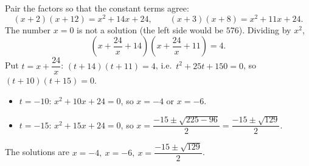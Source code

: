 Pair the factors so that the constant terms agree:
\[
(x+2)(x+12)=x^2+14x+24,\qquad(x+3)(x+8)=x^2+11x+24 .
\]
The number $x=0$ is not a solution (the left side would be $576$). Dividing by $x^2$,
\[
\left(x+\dfrac{24}{x}+14\right)\left(x+\dfrac{24}{x}+11\right)=4 .
\]
Put $t=x+\dfrac{24}{x}$: $(t+14)(t+11)=4$, i.e.\ $t^2+25t+150=0$, so $(t+10)(t+15)=0$.
\begin{itemize}
\item $t=-10$: $x^2+10x+24=0$, so $x=-4$ or $x=-6$.
\item $t=-15$: $x^2+15x+24=0$, so $x=\dfrac{-15\pm\sqrt{225-96}}{2}=\dfrac{-15\pm\sqrt{129}}{2}$.
\end{itemize}
The solutions are $\boxed{x=-4,\ x=-6,\ x=\dfrac{-15\pm\sqrt{129}}{2}}$.

